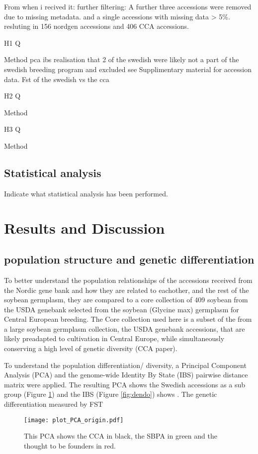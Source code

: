 \documentclass[9pt,twocolumn,twoside,lineno]{gsajnl}
\begin{document}
From when i recived it:
further filtering:
A further three accessions were removed due to missing metadata. and a single accessions with missing data > 5\%.
resluting in 156 nordgen accessions and 406 CCA accessions. 

H1
Q

Method
pca
ibs
realisation that 2 of the swedish were likely not a part of the swedish breeding program and excluded 
see Supplimentary material for accession data. 
Fst of the swedish vs the cca

H2 
Q

Method

H3
Q 

Method


\subsection{Statistical analysis}

Indicate what statistical analysis has been performed.


\section{Results and Discussion}
\subsection{population structure and genetic differentiation} 

To better understand the population relationships of the accessions received from the Nordic gene bank and how they are related to eachother, and the rest of the soybean germplasm, they are compared to a core collection of 409 soybean from the USDA genebank selected from the soybean (Glycine max) germplasm for Central European breeding.  The Core collection used here is a subset of the from a large soybean germplasm collection, the  USDA genebank accessions, that are likely preadapted to cultivation in Central Europe, while simultaneously conserving a high level of genetic diversity (CCA paper). 

To understand the population differentiation/ diversity, a Principal Component Analysis (PCA) and the genome-wide Identity By State (IBS) pairwise distance matrix were applied. The resulting PCA shows the Swedish accessions as a sub group (Figure \ref{fig:pca}) and the IBS (Figure  \ref{fig:dendo}) shows . 
The genetic differentiation measured by FST 

\begin{figure}[t]
\centering
\texttt{[image: plot\_PCA\_origin.pdf]}
\caption{This PCA shows the CCA in black, the SBPA in green and the thought to be founders in red.}%
\label{fig:pca}
\end{figure}
\end{document}
